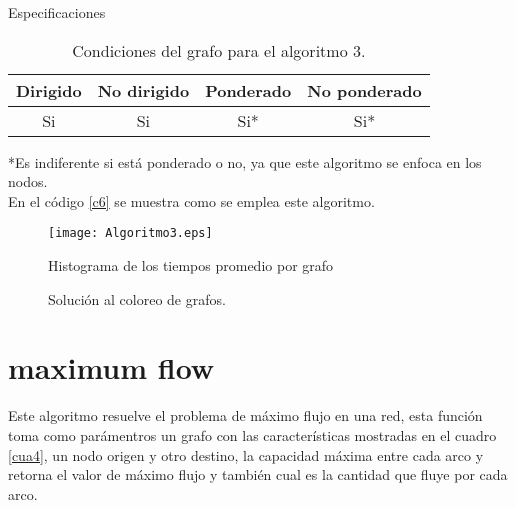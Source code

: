 \documentclass[12pt]{article}
\begin{document}
Especificaciones

\begin{table}[H] 
\caption{{\small Condiciones del grafo para el algoritmo 3.}}
\begin{center}
\begin{tabular}{|c|c|c|c|}
\hline
Dirigido & No dirigido & Ponderado & No ponderado \\ \hline
Si       & Si          & Si*        & Si*        \\  \hline
\end{tabular}
\label{cua3}
\end{center}
\end{table}

*{\small Es indiferente si está ponderado o no, ya que este algoritmo se enfoca en los nodos.}  \\

En el código \ref{c6} se muestra como se emplea este algoritmo. 

 \label{c6}


\begin{figure}[H]
\begin{center}
	\texttt{[image: Algoritmo3.eps]}
\end{center}
\vspace{-.3cm}
\caption{{\small Histograma de los tiempos promedio por grafo}}
\end{figure}


\begin{figure}[H]
\centering
{}\hspace{5mm}
\vspace{10mm}
\hspace{10mm}
\vspace{10mm}
\caption{Solución al coloreo de grafos.} \label{g3}
\end{figure}

\newpage
\section{maximum flow}
Este algoritmo resuelve el problema de máximo flujo en una red, esta función toma como parámentros un grafo con las características mostradas en el cuadro \ref{cua4}, un nodo origen y otro destino, la capacidad máxima entre cada arco y retorna el valor de máximo flujo y también cual es la cantidad que fluye por cada arco. \\
\end{document}
